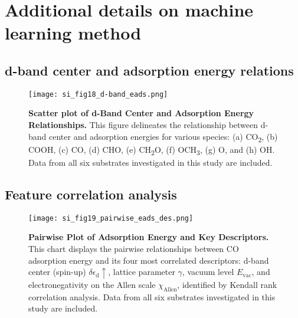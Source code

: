 
\section{Additional details on machine learning method}

\subsection{d-band center and adsorption energy relations}
\label{si_sec3.1_dband_eads}

\begin{figure}[htbp]
  \centering
  \texttt{[image: si\_fig18\_d-band\_eads.png]}
  \caption{\textbf{Scatter plot of d-Band Center and Adsorption Energy Relationships.}
  This figure delineates the relationship between d-band center and adsorption energies for
  various species: (a) CO\textsubscript{2}, (b) COOH, (c) CO, (d) CHO,
  (e) CH\textsubscript{2}O, (f) OCH\textsubscript{3}, (g) O, and (h) OH.
  Data from all six substrates investigated in this study are included.}
  \label{si_fig18:dband_vs_eads}
\end{figure}

\subsection{Feature correlation analysis}
\label{si_sec3.2_feature_corr}

\begin{figure}[htbp]
  \centering
  \texttt{[image: si\_fig19\_pairwise\_eads\_des.png]}
  \caption{\textbf{Pairwise Plot of Adsorption Energy and Key Descriptors.}
  This chart displays the pairwise relationships between CO adsorption energy and
  its four most correlated descriptors: d-band center (spin-up) $\delta\epsilon_{\text{d}}\uparrow$,
  lattice parameter $\gamma$, vacuum level $E_\text{vac}$, and electronegativity
  on the Allen scale $\chi_\text{Allen}$, identified by Kendall rank correlation analysis.
  Data from all six substrates investigated in this study are included.}
  \label{si_fig19:pairwise_eads_des}
\end{figure}

